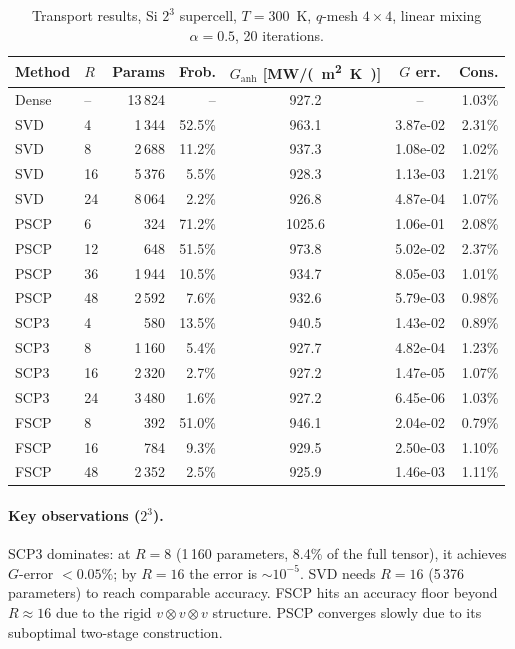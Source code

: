 \documentclass[11pt]{article}
\begin{document}
\begin{table}[ht]
\centering
\caption{Transport results, Si $2^3$ supercell, $T=300$~K,
$q$-mesh $4\!\times\!4$, linear mixing $\alpha=0.5$, 20 iterations.}
\label{tab:transport-222}
\begin{tabular}{@{}llrrS[table-format=4.1]S[table-format=1.2e-1]r@{}}
\toprule
\textbf{Method} & $R$ & \textbf{Params} &
  {\textbf{Frob.}} &
  {$G_\mathrm{anh}$ [\si{MW/(m^2.K)}]} &
  {\textbf{$G$ err.}} &
  {\textbf{Cons.}} \\
\midrule
Dense & -- & 13\,824 & --     & 927.2 & {--}      & 1.03\% \\
\midrule
SVD   &  4 &  1\,344 & 52.5\% &  963.1 & 3.87e-02 & 2.31\% \\
SVD   &  8 &  2\,688 & 11.2\% &  937.3 & 1.08e-02 & 1.02\% \\
SVD   & 16 &  5\,376 &  5.5\% &  928.3 & 1.13e-03 & 1.21\% \\
SVD   & 24 &  8\,064 &  2.2\% &  926.8 & 4.87e-04 & 1.07\% \\
\midrule
PSCP  &  6 &    324  & 71.2\% & 1025.6 & 1.06e-01 & 2.08\% \\
PSCP  & 12 &    648  & 51.5\% &  973.8 & 5.02e-02 & 2.37\% \\
PSCP  & 36 &  1\,944 & 10.5\% &  934.7 & 8.05e-03 & 1.01\% \\
PSCP  & 48 &  2\,592 &  7.6\% &  932.6 & 5.79e-03 & 0.98\% \\
\midrule
SCP3  &  4 &    580  & 13.5\% &  940.5 & 1.43e-02 & 0.89\% \\
SCP3  &  8 &  1\,160 &  5.4\% &  927.7 & 4.82e-04 & 1.23\% \\
SCP3  & 16 &  2\,320 &  2.7\% &  927.2 & 1.47e-05 & 1.07\% \\
SCP3  & 24 &  3\,480 &  1.6\% &  927.2 & 6.45e-06 & 1.03\% \\
\midrule
FSCP  &  8 &    392  & 51.0\% &  946.1 & 2.04e-02 & 0.79\% \\
FSCP  & 16 &    784  &  9.3\% &  929.5 & 2.50e-03 & 1.10\% \\
FSCP  & 48 &  2\,352 &  2.5\% &  925.9 & 1.46e-03 & 1.11\% \\
\bottomrule
\end{tabular}
\end{table}

\paragraph{Key observations ($2^3$).}
SCP3 dominates: at $R=8$ (1\,160 parameters, 8.4\% of the full
tensor), it achieves $G$-error $< 0.05\%$; by $R=16$ the error is
${\sim}10^{-5}$.  SVD needs $R=16$ (5\,376 parameters) to reach
comparable accuracy.  FSCP hits an accuracy floor beyond $R \approx 16$
due to the rigid $v \otimes v \otimes v$ structure.  PSCP converges
slowly due to its suboptimal two-stage construction.
\end{document}
